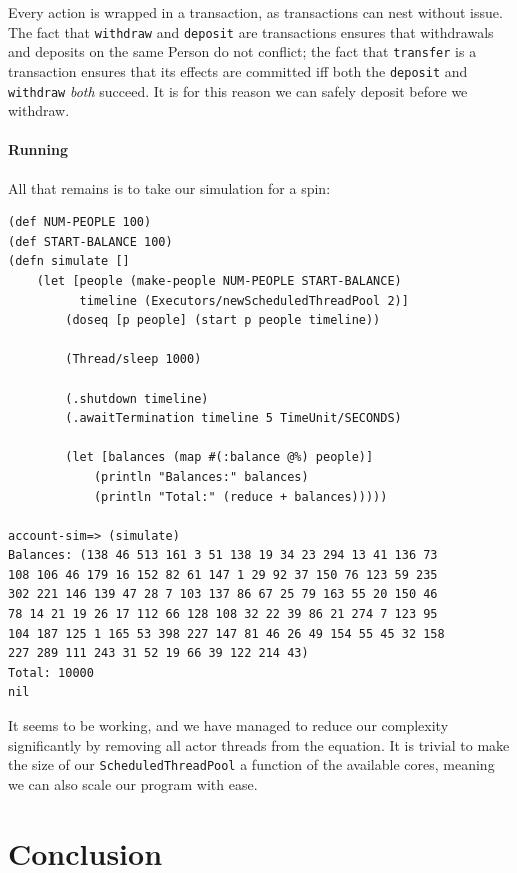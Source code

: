 \documentclass[a4paper,12pt]{kth-mag}
\begin{document}
Every action is wrapped in a transaction, as transactions can nest without issue. The fact that \texttt{withdraw} and \texttt{deposit} are transactions ensures that withdrawals and deposits on the same Person do not conflict; the fact that \texttt{transfer} is a transaction ensures that its effects are committed iff both the \texttt{deposit} and \texttt{withdraw} \textit{both} succeed. It is for this reason we can safely deposit before we withdraw.

\subsection{Running}

All that remains is to take our simulation for a spin:

\begin{listing}[H]
	\begin{verbatim}
(def NUM-PEOPLE 100)
(def START-BALANCE 100)
(defn simulate []
    (let [people (make-people NUM-PEOPLE START-BALANCE)
          timeline (Executors/newScheduledThreadPool 2)]
        (doseq [p people] (start p people timeline))
        
        (Thread/sleep 1000)
        
        (.shutdown timeline)
        (.awaitTermination timeline 5 TimeUnit/SECONDS)
        
        (let [balances (map #(:balance @%) people)]
            (println "Balances:" balances)
            (println "Total:" (reduce + balances)))))
            
account-sim=> (simulate)
Balances: (138 46 513 161 3 51 138 19 34 23 294 13 41 136 73 
108 106 46 179 16 152 82 61 147 1 29 92 37 150 76 123 59 235 
302 221 146 139 47 28 7 103 137 86 67 25 79 163 55 20 150 46 
78 14 21 19 26 17 112 66 128 108 32 22 39 86 21 274 7 123 95 
104 187 125 1 165 53 398 227 147 81 46 26 49 154 55 45 32 158 
227 289 111 243 31 52 19 66 39 122 214 43)
Total: 10000
nil
	\end{verbatim}
\end{listing}

It seems to be working, and we have managed to reduce our complexity significantly by removing all actor threads from the equation. It is trivial to make the size of our \texttt{ScheduledThreadPool} a function of the available cores, meaning we can also scale our program with ease.

\part{ Conclusion}
\end{document}
